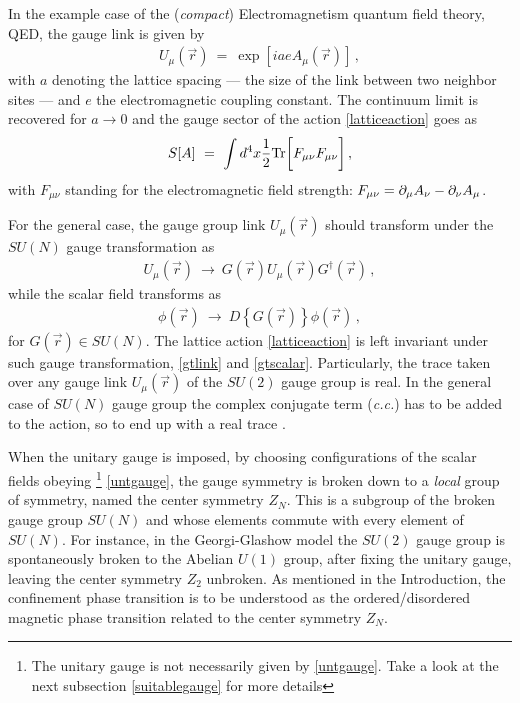 In the example case of the (\emph{compact}) Electromagnetism quantum field theory, QED, the gauge
link is given by
\begin{eqnarray}
U_{\mu}(\vec{r}) ~=~ \exp\left[ i aeA_{\mu}(\vec{r})  \right]\,,
\end{eqnarray}
with $a$ denoting the lattice spacing --- the size of the link between two neighbor sites ---
and $e$ the electromagnetic coupling constant. The continuum limit is recovered for $a \to 0$
and the gauge sector of the action \eqref{latticeaction} goes as
\begin{eqnarray}
S[A] ~=~ \int d^{4}x \frac12 \mathrm{Tr}\bigg[ F_{\mu\nu}F_{\mu\nu} \bigg]\,,
\end{eqnarray}
with $F_{\mu\nu}$ standing for the electromagnetic field strength: $F_{\mu\nu} =
\partial_{\mu}A_{\nu} - \partial_{\nu}A_{\mu}$.

For the general case, the gauge group link $U_{\mu}(\vec{r})$ should transform under the $SU(N)$ gauge transformation as
\begin{eqnarray}
U_{\mu}(\vec{r}) ~\to~ G(\vec{r}) U_{\mu}(\vec{r}) G^{\dagger}(\vec{r})\,,
\label{gtlink}
\end{eqnarray}
while the scalar field transforms as 
\begin{eqnarray}
\phi(\vec{r}) ~\to~ D\left\{G(\vec{r})\right\}\phi(\vec{r})\,,
\label{gtscalar}
\end{eqnarray}
for $G(\vec{r}) \in SU(N)$. The lattice action \eqref{latticeaction} is left invariant under
such gauge transformation, \eqref{gtlink} and \eqref{gtscalar}. Particularly, the trace taken
over any gauge link $U_{\mu}(\vec{r})$ of the $SU(2)$ gauge group is real. In the general case
of $SU(N)$ gauge group the complex conjugate term (\emph{c.c.}) has to be added to the action,
so to end up with a real trace \cite{Fradkin:1978dv,Greensite:2011zz,Montvay:1994cy}.

When the unitary gauge is imposed, by choosing configurations of the scalar fields obeying
\footnote{The unitary gauge is not necessarily given by \eqref{untgauge}. Take a look at the
next subsection \ref{suitablegauge} for more details} \eqref{untgauge}, the gauge symmetry
is broken down to a \emph{local} group of symmetry, named the center symmetry $Z_{N}$. This is
a subgroup of the broken gauge group $SU(N)$ and whose elements commute with every element
of $SU(N)$. For instance, in the Georgi-Glashow model the
$SU(2)$ gauge group is spontaneously broken to the Abelian $U(1)$ group, after fixing the
unitary gauge, leaving the center symmetry $Z_{2}$ unbroken. As mentioned in the Introduction,
the confinement phase transition is to be understood as the ordered/disordered magnetic phase
transition related to the center symmetry $Z_{N}$.

